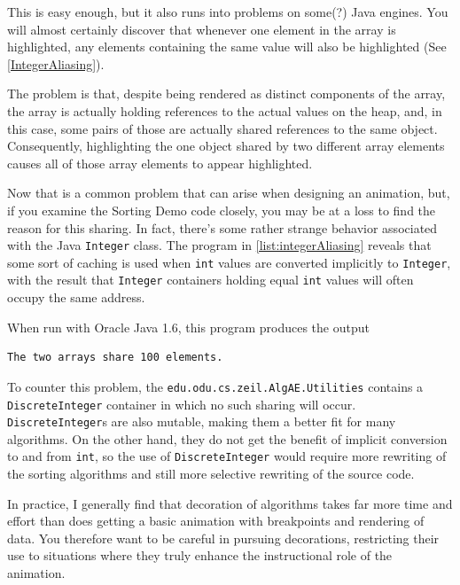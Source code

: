 \documentclass[11pt,titlepage]{book}
\begin{document}
This is easy enough, but it also runs into problems on some(?) Java
engines.  You will almost certainly discover that whenever one element
in the array is highlighted, any elements containing the same value
will also be highlighted (See \autoref{IntegerAliasing}).

The problem is that, despite being rendered as distinct components of
the array, the array is actually holding references to the actual
values on the heap, and, in this case, some pairs of those are
actually shared references to the same object. Consequently,
highlighting the one object shared by two different array elements
causes all of those array elements to appear highlighted.

Now that is a common problem that can arise when designing an
animation, but, if you examine the Sorting Demo code closely, you may
be at a loss to find the reason for this sharing. In fact, there's
some rather strange behavior associated with the Java \texttt{Integer}
class. The program in \autoref{list:integerAliasing} reveals that some
sort of caching is used when \texttt{int} values are converted
implicitly to \texttt{Integer}, with the result that \texttt{Integer}
containers holding equal {\tt int} values will often occupy the same
address.



When run with Oracle Java 1.6, this program produces the output
\begin{verbatim}
The two arrays share 100 elements.
\end{verbatim}


To counter this problem, the \texttt{edu.odu.cs.zeil.AlgAE.Utilities}
contains a \texttt{DiscreteInteger} container in which no such sharing
will occur. \texttt{DiscreteInteger}s are also mutable, making them a
better fit for many algorithms. On the other hand, they do not get the
benefit of implicit conversion to and from \texttt{int}, so the use of
\texttt{DiscreteInteger} would require more rewriting of the sorting
algorithms and still more selective rewriting of the source code.

In practice, I generally find that decoration of algorithms takes far
more time and effort than does getting a basic animation with
breakpoints and rendering of data.  You therefore want to be careful
in pursuing decorations, restricting their use to situations where they
truly enhance the instructional role of the animation.
\end{document}
